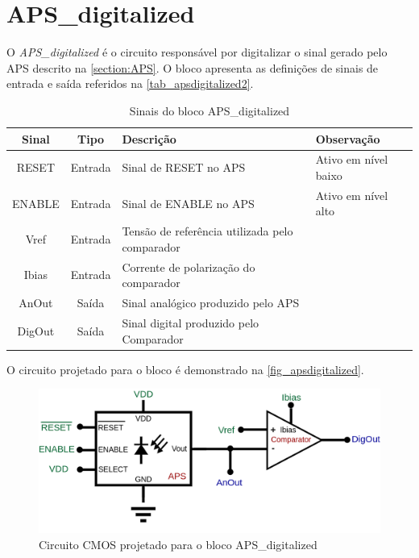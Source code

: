 \renewcommand{\NomeBloco}{APS\_digitalized}
\renewcommand{\NomeBlocoNoUnderline}{apsdigitalized}
\renewcommand{\NomePTab}{tab_\NomeBlocoNoUnderline}
\renewcommand{\NomeSTab}{tab_\NomeBlocoNoUnderline2}
\renewcommand{\NomePFig}{fig_\NomeBlocoNoUnderline}
\renewcommand{\NomeSFig}{fig_\NomeBlocoNoUnderline2}
\renewcommand{\NomeTTab}{tab_\NomeBlocoNoUnderline3}
\renewcommand{\NomeQTab}{tab_\NomeBlocoNoUnderline4}

\section{\NomeBloco}
\label{sec_apsdigitalized}

O \emph{APS\_digitalized} \'e o circuito respons\'avel por digitalizar o sinal gerado pelo APS descrito na \autoref{section:APS}. O bloco apresenta as defini{\c c}\~oes de sinais de entrada e sa\'ida referidos na \autoref{\NomeSTab}.

\begin{table}[htbp]
\caption{Sinais do bloco \NomeBloco}
\label{\NomeSTab}
\centering
\begin{tabular}{ccll}

    \toprule
    Sinal & Tipo    & Descri{\c c}\~ao & Observa{\c c}\~ao        \\
    \midrule \midrule
    RESET   & Entrada   & Sinal de RESET no APS & Ativo em nível baixo\\
    \midrule
    ENABLE   & Entrada   & Sinal de ENABLE no APS & Ativo em nível alto\\
    \midrule
    Vref   & Entrada   & Tens\~ao de refer\^encia utilizada pelo comparador \\
    \midrule
    Ibias   & Entrada   & Corrente de polariza{\c c}\~ao do comparador \\
    \midrule
    AnOut   & Saída   & Sinal anal\'ogico produzido pelo APS \\
    \midrule
    DigOut   & Saída   & Sinal digital produzido pelo Comparador \\
    \bottomrule
\end{tabular}
\end{table}

O circuito projetado para o bloco \'e demonstrado na \autoref{\NomePFig}.

\begin{figure}[htb]
 \label{\NomePFig}
 \centering
    \centering
    \caption{Circuito CMOS projetado para o bloco \NomeBloco} 
    \includegraphics[scale=0.4]{Circuitos/APS_digitalized.png}
\end{figure}

